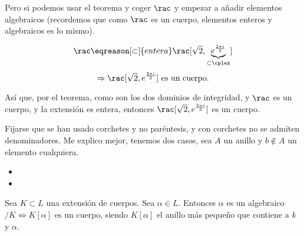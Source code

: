 	\begin{example}[3]
		Pero si podemos usar el teorema y coger $\rac$ y empezar a añadir elementos algebraicos (recordemos que como $\rac$ es un cuerpo, elementos enteros y algebraicos es lo mismo).
		
		\[ \rac \eqreason[\subset]{entera} \rac[\sqrt{2}, \underbrace{e^{\frac{2\pi i}{3}}}_{\subset \cplex}] \]
		\[ \Rightarrow \rac[\sqrt{2}, e^{\frac{2\pi i}{3}}] \text{ es un cuerpo.}\]
		
		Así que, por el teorema, como son los dos dominios de integridad, y $\rac$ es un cuerpo, y la extensión es entera, entonces $\rac[\sqrt{2}, e^{\frac{2\pi i}{3}}]$ es un cuerpo.
	\end{example}
	
	\notacion Fijarse que se han usado corchetes y no paréntesis, y con corchetes no se admiten denominadores. Me explico mejor, tenemos dos casos, sea $A$ un anillo y $b\notin A$ un elemento cualquiera.
	\begin{itemize}
		\item
		\item
	\end{itemize}

	\begin{corol}\label{cor:1}
		Sea $K \subset L$ una extensión de cuerpos. Sea $\alpha \in L$. Entonces $\alpha$ es un algebraico$/K \Leftrightarrow K[\alpha]$ es un cuerpo, siendo $K[\alpha]$ el anillo más pequeño que contiene a $k$ y $\alpha$.
	\end{corol}

